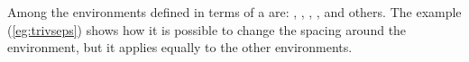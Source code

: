 Among the environments defined in terms of a  are:
,
,
,
, and others.
The example (\ref{eg:trivseps}) shows how it is possible to change the
spacing around the  environment, but it applies equally to the 
other environments.


